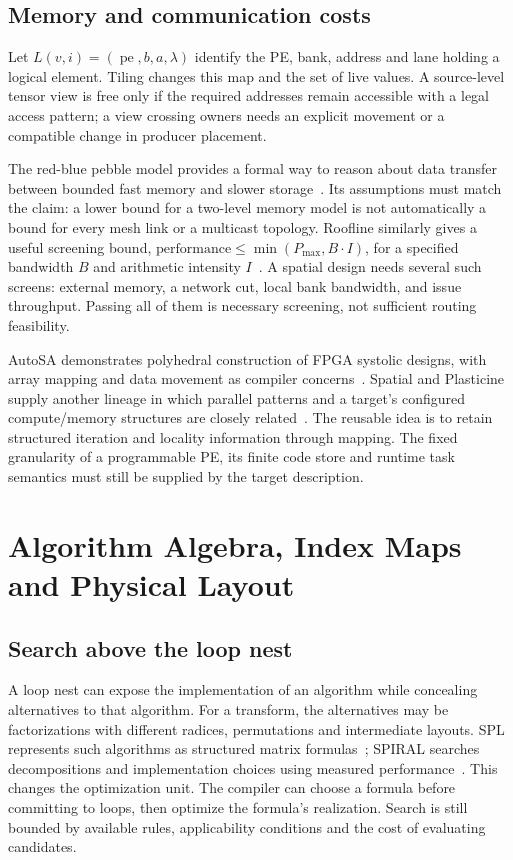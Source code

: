 \documentclass[final,3p,times,authoryear]{elsarticle}
\newcommand{\pe}{\operatorname{pe}}
\begin{document}
\subsection{Memory and communication costs}
Let $L(v,i)=(\pe,b,a,\lambda)$ identify the PE, bank, address and lane holding a logical element. Tiling changes this map and the set of live values. A source-level tensor view is free only if the required addresses remain accessible with a legal access pattern; a view crossing owners needs an explicit movement or a compatible change in producer placement.

The red-blue pebble model provides a formal way to reason about data transfer between bounded fast memory and slower storage~\citep{hong1981}. Its assumptions must match the claim: a lower bound for a two-level memory model is not automatically a bound for every mesh link or a multicast topology. Roofline similarly gives a useful screening bound, $\mathrm{performance}\le\min(P_{\max},B\cdot I)$, for a specified bandwidth $B$ and arithmetic intensity $I$~\citep{williams2009}. A spatial design needs several such screens: external memory, a network cut, local bank bandwidth, and issue throughput. Passing all of them is necessary screening, not sufficient routing feasibility.

AutoSA demonstrates polyhedral construction of FPGA systolic designs, with array mapping and data movement as compiler concerns~\citep{wang2021autosa}. Spatial and Plasticine supply another lineage in which parallel patterns and a target's configured compute/memory structures are closely related~\citep{koeplinger2018,prabhakar2017}. The reusable idea is to retain structured iteration and locality information through mapping. The fixed granularity of a programmable PE, its finite code store and runtime task semantics must still be supplied by the target description.


\section{Algorithm Algebra, Index Maps and Physical Layout}\label{sec:algebra}
\subsection{Search above the loop nest}
A loop nest can expose the implementation of an algorithm while concealing alternatives to that algorithm. For a transform, the alternatives may be factorizations with different radices, permutations and intermediate layouts. SPL represents such algorithms as structured matrix formulas~\citep{spl2001}; SPIRAL searches decompositions and implementation choices using measured performance~\citep{spiral2005}. This changes the optimization unit. The compiler can choose a formula before committing to loops, then optimize the formula's realization. Search is still bounded by available rules, applicability conditions and the cost of evaluating candidates.
\end{document}
